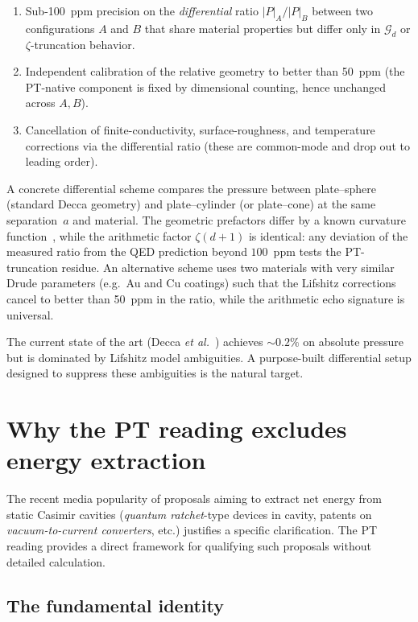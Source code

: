 \documentclass[11pt,a4paper]{article}
\begin{document}
\begin{enumerate}
  \item Sub-100~ppm precision on the \emph{differential} ratio $|P|_A/|P|_B$ between two
  configurations $A$ and $B$ that share material properties but differ only in
  $\mathcal{G}_d$ or $\zeta$-truncation behavior.
  \item Independent calibration of the relative geometry to better than 50~ppm (the PT-native
  component is fixed by dimensional counting, hence unchanged across $A, B$).
  \item Cancellation of finite-conductivity, surface-roughness, and temperature corrections
  via the differential ratio (these are common-mode and drop out to leading order).
\end{enumerate}

A concrete differential scheme compares the pressure between plate--sphere (standard Decca
geometry) and plate--cylinder (or plate--cone) at the same separation~$a$ and material. The
geometric prefactors differ by a known curvature function~\cite{Mostepanenko2009}, while the
arithmetic factor $\zeta(d+1)$ is identical: any deviation of the measured ratio from the
QED prediction beyond $100$~ppm tests the PT-truncation residue. An alternative scheme uses
two materials with very similar Drude parameters (e.g.\ Au and Cu coatings) such that the
Lifshitz corrections cancel to better than 50~ppm in the ratio, while the arithmetic echo
signature is universal.

The current state of the art (Decca \emph{et al.}~\cite{Decca2007}) achieves $\sim 0.2\%$
on absolute pressure but is dominated by Lifshitz model ambiguities. A purpose-built
differential setup designed to suppress these ambiguities is the natural target.

\section{Why the PT reading excludes energy extraction}
\label{sec:no-extraction}

The recent media popularity of proposals aiming to extract net energy from static Casimir
cavities (\emph{quantum ratchet}-type devices in cavity, patents on \emph{vacuum-to-current
converters}, etc.) justifies a specific clarification. The PT reading provides a direct
framework for qualifying such proposals without detailed calculation.

\subsection{The fundamental identity}
\end{document}
